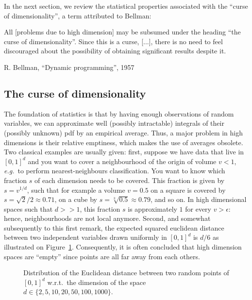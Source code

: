 \setlength{\epigraphwidth}{0.8\textwidth}

In the next section, we review the statistical properties associated with the ``curse of dimensionality'', a term attributed to Bellman:
\epigraph{All [problems due to high dimension] may be subsumed under the heading “the curse of dimensionality”. Since this is a curse, [...], there is no need to feel discouraged about the possibility of obtaining significant results despite it.}{R. Bellman, ``Dynamic programming'', 1957}

\subsection{The curse of dimensionality}

The foundation of statistics is that by having enough observations of random variables, we can approximate well (possibly intractable) integrals of their (possibly unknown) \gls{pdf} by an empirical average. Thus, a major problem in high dimensions is their relative emptiness, which makes the use of averages obsolete. Two classical examples are usually given: first, suppose we have data that live in $[0,1]^d$ and you want to cover a neighbourhood of the origin of volume $v < 1$, \textit{e.g.}\ to perform nearest-neighbours classification. You want to know which fraction $s$ of each dimension needs to be covered. This fraction is given by $s = v^{1/d}$, such that for example a volume $v=0.5$ on a square is covered by $s = \sqrt{2}/2 \approx 0.71$, on a cube by $s = \sqrt[3]{0.5} \approx 0.79$, and so on. In high dimensional spaces such that $d>>1$, this fraction $s$ is approximately $1$ for every $v > \epsilon$: hence, neighbourhoods are not local anymore. Second, and somewhat subsequently to this first remark, the expected squared euclidean distance between two independent variables drawn uniformly in $[0,1]^d$ is $d/6$ as illustrated on Figure~\ref{fig:distance}. Consequently, it is often concluded that high dimension spaces are ``empty'' since points are all far away from each others.

\begin{figure}[!ht]
\centering
\resizebox{\textwidth}{!}{}
\caption{Distribution of the Euclidean distance between two random points of $[0,1]^d$ w.r.t.\ the dimension of the space $d \in \{ 2, 5, 10, 20, 50, 100, 1000 \}$.}
\label{fig:distance}
\end{figure}


